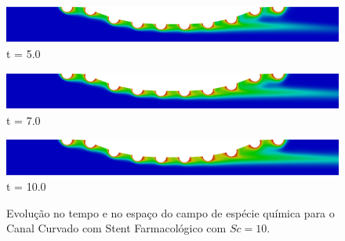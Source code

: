 \begin{figure}[H]
     \begin{minipage}{.50\linewidth}
      \centering
      \includegraphics[scale=0.12]{./02_chaps/cap_solution/figure/conc10_CurvedStrut25000.png}\\
      t = 5.0
     \end{minipage}
     \begin{minipage}{.50\linewidth}
     \medskip
      \centering
      \includegraphics[scale=0.12]{./02_chaps/cap_solution/figure/conc10_CurvedStrut35000.png}\\
      t = 7.0
     \end{minipage}%
     \begin{minipage}{.50\linewidth}
     \medskip
      \centering
      \includegraphics[scale=0.12]{./02_chaps/cap_solution/figure/conc10_CurvedStrut50000.png}\\
      t = 10.0
     \end{minipage}
     \medskip
     \caption{Evolução no tempo e no espaço do campo de espécie química para o Canal Curvado com Stent Farmacológico com $Sc=10$.}
     \label{conc field curved stent sc 10}
\end{figure}

\medskip
